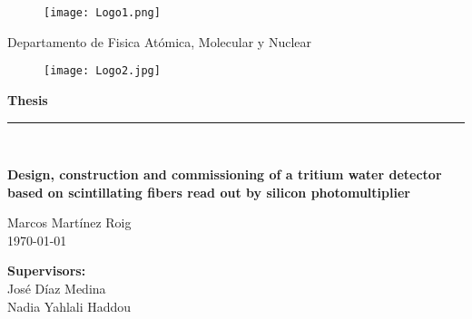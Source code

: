 \begin{titlepage}

\begin{center}
\vspace*{-1in}
\vspace*{1 cm}
\begin{figure}[htb]
\begin{center}
\texttt{[image: Logo1.png]}
\end{center}
\end{figure}
\vspace*{2 cm}


\vspace*{0.2in}
{\huge Departamento de Fisica Atómica, Molecular y Nuclear}\\
\vspace*{0.2in}
\vspace*{0.6in}
\end{center}
\vspace*{-1in}
\begin{center}
\vspace*{0.25 cm}


\begin{figure}[htb]
\begin{center}
\texttt{[image: Logo2.jpg]} 
\end{center}
\end{figure}
\vspace*{1 cm}

\begin{large}
\textbf{{\large Thesis}}\\
\rule{80mm}{0.1mm}\\

\end{large}
\vspace*{0.2in}
\begin{Large}
\textbf{\LARGE Design, construction and commissioning of a tritium water detector based on scintillating fibers read out by silicon photomultiplier} \\
\end{Large}
\vspace*{1 cm}

\begin{large}
Marcos Martínez Roig\\
\today
\end{large}
\end{center}

\begin{large}
\begin{flushright}
\item[\bf Supervisors:\hspace{4cm} ]\quad  \\ José Díaz Medina\\
Nadia Yahlali Haddou\\
\end{flushright}
\end{large}

\end{titlepage}
